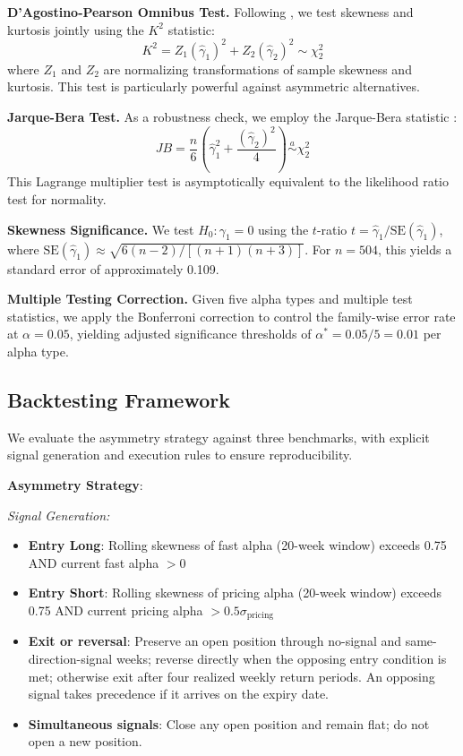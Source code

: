 \documentclass[11pt]{article}
\begin{document}
\textbf{D'Agostino-Pearson Omnibus Test.} Following \citet{dagostino1990suggestion}, we test skewness and kurtosis jointly using the $K^2$ statistic:
\begin{equation}
    K^2 = Z_1(\hat{\gamma}_1)^2 + Z_2(\hat{\gamma}_2)^2 \sim \chi^2_2
\end{equation}
where $Z_1$ and $Z_2$ are normalizing transformations of sample skewness and kurtosis. This test is particularly powerful against asymmetric alternatives.

\textbf{Jarque-Bera Test.} As a robustness check, we employ the Jarque-Bera statistic \citep{jarque1980efficient}:
\begin{equation}
    JB = \frac{n}{6} \left( \hat{\gamma}_1^2 + \frac{(\hat{\gamma}_2)^2}{4} \right) \stackrel{a}{\sim} \chi^2_2
\end{equation}
This Lagrange multiplier test is asymptotically equivalent to the likelihood ratio test for normality.

\textbf{Skewness Significance.} We test $H_0: \gamma_1 = 0$ using the $t$-ratio $t = \hat{\gamma}_1 / \text{SE}(\hat{\gamma}_1)$, where $\text{SE}(\hat{\gamma}_1) \approx \sqrt{6(n-2)/[(n+1)(n+3)]}$. For $n = 504$, this yields a standard error of approximately 0.109.

\textbf{Multiple Testing Correction.} Given five alpha types and multiple test statistics, we apply the Bonferroni correction to control the family-wise error rate at $\alpha = 0.05$, yielding adjusted significance thresholds of $\alpha^* = 0.05/5 = 0.01$ per alpha type.

\subsection{Backtesting Framework}

We evaluate the asymmetry strategy against three benchmarks, with explicit signal generation and execution rules to ensure reproducibility.

\textbf{Asymmetry Strategy}:

\textit{Signal Generation:}
\begin{itemize}
    \item \textbf{Entry Long}: Rolling skewness of fast alpha (20-week window) exceeds 0.75 AND current fast alpha $> 0$
    \item \textbf{Entry Short}: Rolling skewness of pricing alpha (20-week window) exceeds 0.75 AND current pricing alpha $> 0.5\sigma_{\text{pricing}}$
    \item \textbf{Exit or reversal}: Preserve an open position through no-signal and same-direction-signal weeks; reverse directly when the opposing entry condition is met; otherwise exit after four realized weekly return periods. An opposing signal takes precedence if it arrives on the expiry date.
    \item \textbf{Simultaneous signals}: Close any open position and remain flat; do not open a new position.
\end{itemize}
\end{document}
